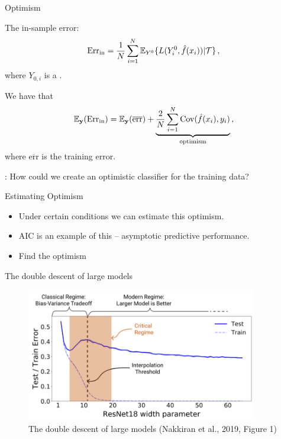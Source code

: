 \documentclass[10pt]{beamer}
\begin{document}

\begin{frame}{Optimism}

The in-sample  error:
\[
\text{Err}_\text{in} = \frac{1}{N}\sum^N_{i=1} \operatorname{\mathbb{E}}_{Y^0}\{L(Y^0_i,\hat{f}(x_i))|\mathcal{T}\}\,,
\]
where $Y_{0,i}$ is a .\\[3mm]

\pause

We have that
\[
\operatorname{\mathbb{E}}_\mathbf{y} (\text{Err}_\text{in}) = \operatorname{\mathbb{E}}_\mathbf{y}(\overline{\text{err}}) + \underbrace{\frac{2}{N}\sum^N_{i=1} \text{Cov}(\hat{f}(x_i),y_i)}_{\text{optimism}}\,,
\]
where $\overline{\text{err}}$ is the training error.

: How could we create an optimistic classifier for the training data?

\end{frame}

\begin{frame}{Estimating Optimism}

\begin{itemize}
\item Under certain conditions we can estimate this optimism.
\item AIC is an example of this -- asymptotic predictive performance.
\item Find the optimism
\end{itemize}


\end{frame}



\begin{frame}{The double descent of large models}

\begin{figure}[h]
\caption{The double descent of large models (Nakkiran et al., 2019, Figure 1)}
\centering
\includegraphics[width=0.9\textwidth]{figs/Nakkiran_et_al_2019.png}
\end{figure}



\end{frame}
\end{document}
